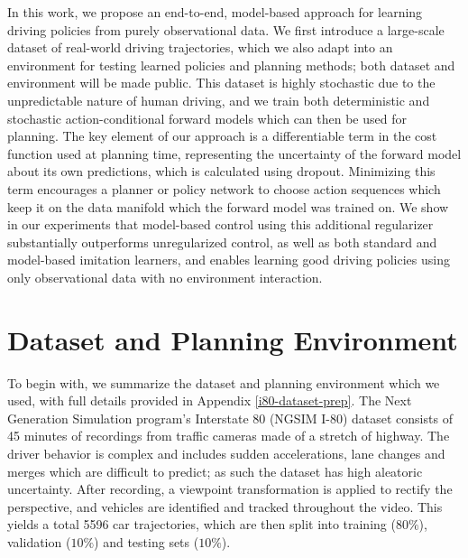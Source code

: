 \documentclass{article} %
\begin{document}
In this work, we propose an end-to-end, model-based approach for learning driving policies from purely observational data.
We first introduce a large-scale dataset of real-world driving trajectories, which we also adapt into an environment for testing learned policies and planning methods; both dataset and environment will be made public.
This dataset is highly stochastic due to the unpredictable nature of human driving, and we train both deterministic and stochastic action-conditional forward models which can then be used for planning.
The key element of our approach is a differentiable term in the cost function used at planning time, representing the uncertainty of the forward model about its own predictions, which is calculated using dropout.
Minimizing this term encourages a planner or policy network to choose action sequences which keep it on the data manifold which the forward model was trained on.
We show in our experiments that model-based control using this additional regularizer substantially outperforms unregularized control, as well as both standard and model-based imitation learners, and enables learning good driving policies using only observational data with no environment interaction.

\section{Dataset and Planning Environment}
\label{dataset-and-planning}

To begin with, we summarize the dataset and planning environment which we used, with full details provided in Appendix \ref{i80-dataset-prep}.
The Next Generation Simulation program's Interstate 80 (NGSIM I-80) dataset \citep{NGSIM} consists of 45 minutes of recordings from traffic cameras made of a stretch of highway.
The driver behavior is complex and includes sudden accelerations, lane changes and merges which are difficult to predict; as such the dataset has high aleatoric uncertainty.
After recording, a viewpoint transformation is applied to rectify the perspective, and vehicles are identified and tracked throughout the video.
This yields a total 5596 car trajectories, which are then split into training ($80\%$), validation ($10\%$) and testing sets ($10\%$).
\end{document}
